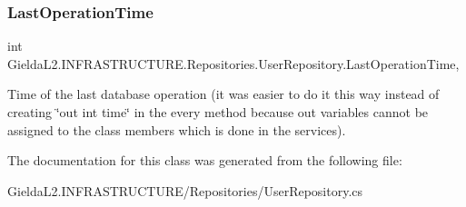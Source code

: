 \subsubsection{\texorpdfstring{LastOperationTime}{LastOperationTime}}
{\footnotesize\ttfamily int Gielda\+L2.\+I\+N\+F\+R\+A\+S\+T\+R\+U\+C\+T\+U\+R\+E.\+Repositories.\+User\+Repository.\+Last\+Operation\+Time\hspace{0.3cm}{\ttfamily [get]}, {\ttfamily [set]}}



Time of the last database operation (it was easier to do it this way instead of creating \char`\"{}out int time\char`\"{} in the every method because out variables cannot be assigned to the class members which is done in the services). 



The documentation for this class was generated from the following file\+:\begin{DoxyCompactItemize}
\item 
Gielda\+L2.\+I\+N\+F\+R\+A\+S\+T\+R\+U\+C\+T\+U\+R\+E/\+Repositories/User\+Repository.\+cs\end{DoxyCompactItemize}
